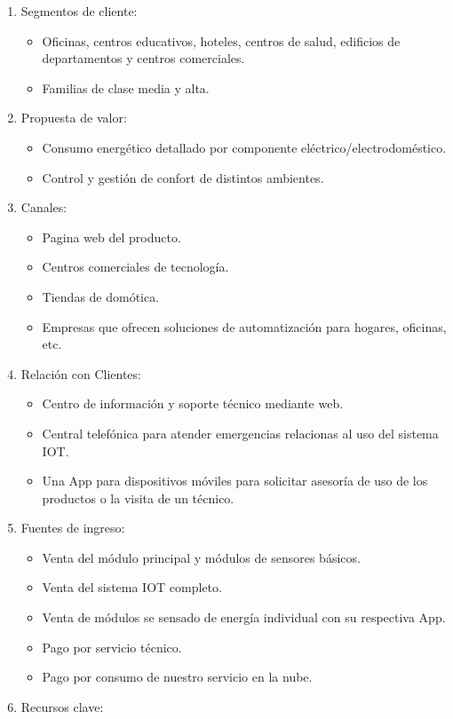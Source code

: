 \documentclass[11pt]{charter}
\begin{document}
\begin{enumerate}
\item Segmentos de cliente:
\begin{itemize}
\item Oficinas, centros educativos, hoteles, centros de salud, edificios de departamentos y centros comerciales.  
\item Familias de clase media y alta.
\end{itemize}
\item Propuesta de valor:
\begin{itemize}
\item Consumo energético detallado por componente eléctrico/electrodoméstico.
\item Control y gestión de confort de distintos ambientes.
\end{itemize}
\item Canales:
   \begin{itemize}
\item Pagina web del producto.
\item Centros comerciales de tecnología.
\item Tiendas de domótica.
\item Empresas que ofrecen soluciones de automatización para hogares, oficinas, etc.
\end{itemize}
\item Relación con Clientes:
\begin{itemize}
\item Centro de información y soporte técnico mediante web.
\item Central telefónica para atender emergencias relacionas al uso del sistema IOT.
\item Una App para dispositivos móviles para solicitar asesoría de uso de los productos o la visita de un técnico. 
\end{itemize}
\item Fuentes de ingreso:
\begin{itemize}
\item Venta del módulo principal y módulos de sensores básicos.
\item Venta del sistema IOT completo.
\item Venta de módulos se sensado de energía individual con su respectiva App.
\item Pago por servicio técnico.
\item Pago por consumo de nuestro servicio en la nube.
\end{itemize}
\item Recursos clave:

\end{enumerate}
\end{document}
